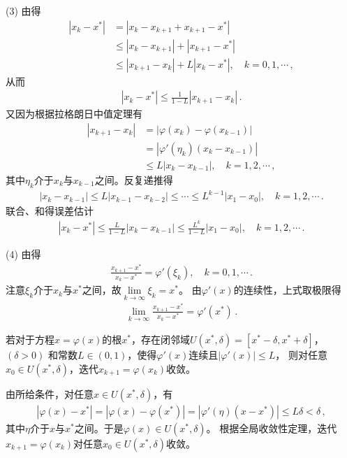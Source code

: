 \begin{prove}
    (3) 由得
    \begin{align}\label{eq:02ex0316}
        |x_k-x^*| & =|x_k-x_{k+1}+x_{k+1}-x^*|\nonumber                \\
                  & \le|x_k-x_{k+1}|+|x_{k+1}-x^*|\nonumber            \\
                  & \le|x_{k+1}-x_k|+L|x_k-x^*|,\quad k=0,1,\cdots\, ,
    \end{align}
    从而
    \begin{align}\label{eq:02ex0317}
        |x_k-x^*|\le\frac{1}{1-L}|x_{k+1}-x_k|\, .
    \end{align}
    又因为根据拉格朗日中值定理有
    \begin{align}\label{eq:02ex0318}
        |x_{k+1}-x_k| & =|\varphi(x_k)-\varphi(x_{k-1})|\nonumber \\
                      & =|\varphi'(\eta_k)(x_k-x_{k-1})|\nonumber \\
                      & \le L|x_k-x_{k-1}|,\quad k=1,2,\cdots\, ,
    \end{align}
    其中$\eta_k$介于$x_k$与$x_{k-1}$之间。反复递推得
    \begin{align}\label{eq:02ex0319}
        |x_k-x_{k-1}|\le L |x_{k-1}-x_{k-2}|\le\cdots\le L^{k-1}|x_1-x_0|,\quad k=1,2,\cdots\, .
    \end{align}
    联合、和得误差估计
    \begin{align}\label{eq:02ex0320}
        |x_k-x^*|\le\frac{L}{1-L}|x_k-x_{k-1}|\le\frac{L^k}{1-L}|x_1-x_0|,\quad k=1,2,\cdots\, .
    \end{align}

    (4) 由得
    \begin{align}\label{eq:02ex0321}
        \frac{x_{k+1}-x^*}{x_k-x^*}=\varphi'(\xi_k),\quad k=0,1,\cdots\, .
    \end{align}
    注意$\xi_k$介于$x_k$与$x^*$之间，故$\displaystyle\lim\limits_{k\rightarrow\infty}{\xi_k}=x^*$。
    由$\varphi'(x)$的连续性，上式取极限得
    \begin{align}\label{eq:02ex0322}
        \lim\limits_{k\rightarrow\infty}{\frac{x_{k+1}-x^*}{x_k-x^*}}=\varphi'(x^*)\, .
    \end{align}
\end{prove}

\begin{theorem}[局部收敛性定理]
    若对于方程$x=\varphi(x)$的根$x^*$，存在闭邻域$U(x^*,\delta)=[x^*-\delta,x^*+\delta]$，$(\delta>0)$
    和常数$L\in(0,1)$，使得$\varphi'(x)$连续且$|\varphi'(x)|\le L$，
    则对任意$x_0\in U(x^*,\delta)$，迭代$x_{k+1}=\varphi(x_k)$收敛。
\end{theorem}
\begin{prove}
    由所给条件，对任意$x\in U(x^*,\delta)$，有
    \begin{align}\label{eq:02ex0323}
        |\varphi(x)-x^*|=|\varphi(x)-\varphi(x^*)|=|\varphi'(\eta)(x-x^*)|\le L\delta<\delta\, ,
    \end{align}
    其中$\eta$介于$x$与$x^*$之间。于是$\varphi(x)\in U(x^*,\delta)$。
    根据全局收敛性定理，迭代$x_{k+1}=\varphi(x_k)$对任意$x_0\in U(x^*,\delta)$收敛。
\end{prove}

